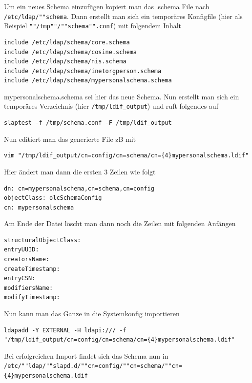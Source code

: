 \documentclass[11pt,a4paper,titlepage=firstiscover,headsepline,bibtotoc]{scrartcl} %
\begin{document}
Um ein neues Schema einzufügen kopiert man das .schema File nach \texttt{/etc/ldap/""schema}.
Dann erstellt man sich ein temporäres Konfigfile (hier als Beispiel \texttt{""/tmp""/""schema"".conf}) mit folgendem Inhalt
\begin{lstlisting}
include /etc/ldap/schema/core.schema
include /etc/ldap/schema/cosine.schema
include /etc/ldap/schema/nis.schema
include /etc/ldap/schema/inetorgperson.schema
include /etc/ldap/schema/mypersonalschema.schema
\end{lstlisting}
mypersonalschema.schema sei hier das neue Schema. Nun erstellt man sich ein temporäres Verzeichnis (hier \texttt{/tmp/ldif\_output}) und ruft folgendes auf
\begin{lstlisting}
slaptest -f /tmp/schema.conf -F /tmp/ldif_output
\end{lstlisting}
Nun editiert man das generierte File zB mit
\begin{lstlisting}
vim "/tmp/ldif_output/cn=config/cn=schema/cn={4}mypersonalschema.ldif"
\end{lstlisting}
Hier ändert man dann die ersten 3 Zeilen wie folgt
\begin{lstlisting}
dn: cn=mypersonalschema,cn=schema,cn=config
objectClass: olcSchemaConfig
cn: mypersonalschema
\end{lstlisting}
Am Ende der Datei löscht man dann noch die Zeilen mit folgenden Anfängen
\begin{lstlisting}
structuralObjectClass:
entryUUID:
creatorsName:
createTimestamp:
entryCSN:
modifiersName:
modifyTimestamp:
\end{lstlisting}
Nun kann man das Ganze in die Systemkonfig importieren
\begin{lstlisting}
ldapadd -Y EXTERNAL -H ldapi:/// -f "/tmp/ldif_output/cn=config/cn=schema/cn={4}mypersonalschema.ldif"
\end{lstlisting}
Bei erfolgreichen Import findet sich das Schema nun in \texttt{/etc/""ldap/""slapd.d/""cn=config/""cn=schema/""cn=\{4\}mypersonalschema.ldif}
\end{document}
